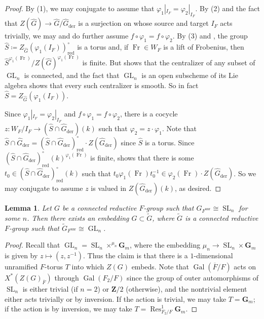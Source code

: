 \documentclass[reqno]{amsart}
\numberwithin{equation}{subsection}
\newcommand{\G}{\mathbf{G}}
\newcommand{\wt}[1]{\widetilde{#1}}
\newcommand{\Z}{\mathbf{Z}}
\newcommand{\Gal}{\operatorname{Gal}}
\newcommand{\ol}[1]{\overline{#1}}
\newcommand{\wh}[1]{\widehat{#1}}
\newcommand{\co}{\colon}
\DeclareMathOperator{\GL}{GL}
\DeclareMathOperator{\SL}{SL}
\DeclareMathOperator{\unr}{unr}
\DeclareMathOperator{\Res}{Res}
\DeclareMathOperator{\red}{red}
\DeclareMathOperator{\der}{der}
\DeclareMathOperator{\Fr}{Fr}
\newtheorem{lemma}[thm]{Lemma}
\theoremstyle{remark}
\numberwithin{equation}{subsection}
\numberwithin{figure}{subsection}
\begin{document}
\begin{proof}
By (1), we may conjugate to assume that $\varphi_1|_{I_F} = \varphi_2|_{I_F}$. By (2) and the fact that $Z(\wh G) \to \wh G/\wh G_{\der}$ is a surjection on whose source and target $I_F$ acts trivially, we may and do further assume $f \circ \varphi_1 = f \circ \varphi_2$. By (3) and \cite[Lemma~10.1.9]{CF26a}, the group $\wh S \coloneqq Z_{\wh G}(\varphi_1(I_F))^\circ_{\red}$ is a torus and, if $\Fr \in W_F$ is a lift of Frobenius, then $\wh S^{\varphi_1(\Fr)}/Z(\wh G)^{\varphi_1(\Fr)}$ is finite. But \cite[III, 3.22]{SS70} shows that the centralizer of any subset of $\GL_n$ is connected, and the fact that $\GL_n$ is an open subscheme of its Lie algebra shows that every such centralizer is smooth. So in fact $\wh S = Z_{\wh G}(\varphi_1(I_F))$.

Since $\varphi_1|_{I_F} = \varphi_2|_{I_F}$ and $f \circ \varphi_1 = f \circ \varphi_2$, there is a cocycle $z\co W_F/I_F \to (\wh S \cap \wh G_{\der})(k)$ such that $\varphi_2 = z \cdot \varphi_1$. Note that $\wh S \cap \wh G_{\der} = (\wh S \cap \wh G_{\der})^\circ_{\red} \cdot Z(\wh G_{\der})$ since $\wh S$ is a torus. Since $(\wh S \cap \wh G_{\der})^\circ_{\red}(k)^{\varphi_1(\Fr)}$ is finite, \cite[Lemma~5.3.4]{Cot26b} shows that there is some $t_0 \in (\wh S \cap \wh G_{\der})^\circ_{\red}(k)$ such that $t_0 \varphi_1(\Fr) t_0^{-1} \in \varphi_2(\Fr) \cdot Z(\wh G_{\der})$. So we may conjugate to assume $z$ is valued in $Z(\wh G_{\der})(k)$, as desired.
\end{proof}

\begin{lemma}\label{lemma:embed-sln-to-gln}
Let $G$ be a connected reductive $F$-group such that $G_{F^{\unr}} \cong \SL_n$ for some $n$. Then there exists an embedding $G \subset \wt G$, where $\wt G$ is a connected reductive $F$-group such that $\wt G_{F^{\unr}} \cong \GL_n$.
\end{lemma}

\begin{proof}
Recall that $\GL_n = \SL_n \times^{\mu_n} \G_m$, where the embedding $\mu_n \to \SL_n \times \G_m$ is given by $z \mapsto (z, z^{-1})$. Thus the claim is that there is a $1$-dimensional unramified $F$-torus $T$ into which $Z(G)$ embeds. Note that $\Gal(\ol F/F)$ acts on $X^*(Z(G)_{\ol F})$ through $\Gal(F_2/F)$ since the group of outer automorphisms of $\SL_n$ is either trivial (if $n = 2$) or $\Z/2$ (otherwise), and the nontrivial element either acts trivially or by inversion. If the action is trivial, we may take $T = \G_m$; if the action is by inversion, we may take $T = \Res^1_{F_2/F}\G_m$.
\end{proof}
\end{document}

